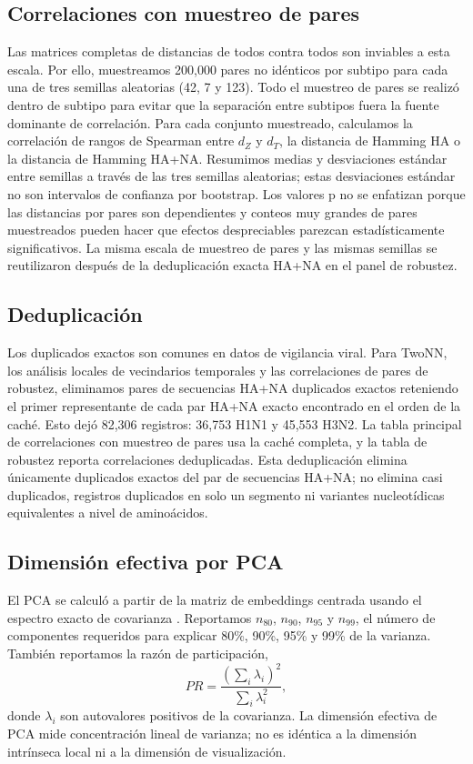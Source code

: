 \documentclass[11pt]{article}
\begin{document}
\subsection{Correlaciones con muestreo de pares}

Las matrices completas de distancias de todos contra todos son inviables a esta escala. Por ello, muestreamos 200,000 pares no idénticos por subtipo para cada una de tres semillas aleatorias (42, 7 y 123). Todo el muestreo de pares se realizó dentro de subtipo para evitar que la separación entre subtipos fuera la fuente dominante de correlación. Para cada conjunto muestreado, calculamos la correlación de rangos de Spearman \cite{spearman1904} entre $d_Z$ y $d_T$, la distancia de Hamming HA o la distancia de Hamming HA+NA. Resumimos medias y desviaciones estándar entre semillas a través de las tres semillas aleatorias; estas desviaciones estándar no son intervalos de confianza por bootstrap. Los valores p no se enfatizan porque las distancias por pares son dependientes y conteos muy grandes de pares muestreados pueden hacer que efectos despreciables parezcan estadísticamente significativos. La misma escala de muestreo de pares y las mismas semillas se reutilizaron después de la deduplicación exacta HA+NA en el panel de robustez.

\subsection{Deduplicación}

Los duplicados exactos son comunes en datos de vigilancia viral. Para TwoNN, los análisis locales de vecindarios temporales y las correlaciones de pares de robustez, eliminamos pares de secuencias HA+NA duplicados exactos reteniendo el primer representante de cada par HA+NA exacto encontrado en el orden de la caché. Esto dejó 82,306 registros: 36,753 H1N1 y 45,553 H3N2. La tabla principal de correlaciones con muestreo de pares usa la caché completa, y la tabla de robustez reporta correlaciones deduplicadas. Esta deduplicación elimina únicamente duplicados exactos del par de secuencias HA+NA; no elimina casi duplicados, registros duplicados en solo un segmento ni variantes nucleotídicas equivalentes a nivel de aminoácidos.

\subsection{Dimensión efectiva por PCA}

El PCA se calculó a partir de la matriz de embeddings centrada usando el espectro exacto de covarianza \cite{jolliffe2002pca,jolliffe2016pca}. Reportamos $n_{80}$, $n_{90}$, $n_{95}$ y $n_{99}$, el número de componentes requeridos para explicar 80\%, 90\%, 95\% y 99\% de la varianza. También reportamos la razón de participación,
\[
PR=\frac{(\sum_i\lambda_i)^2}{\sum_i\lambda_i^2},
\]
donde $\lambda_i$ son autovalores positivos de la covarianza. La dimensión efectiva de PCA mide concentración lineal de varianza; no es idéntica a la dimensión intrínseca local ni a la dimensión de visualización.
\end{document}
